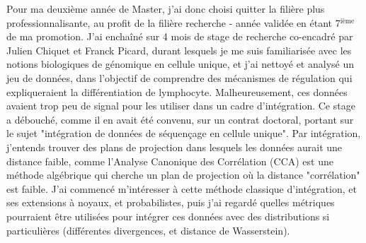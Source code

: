 \documentclass[a4paper,12pt]{article}
\begin{document}
Pour ma deuxième année de Master, j'ai donc choisi quitter la filière plus professionnalisante, au profit de la filière recherche - année validée en étant 7$^{\text{ième}}$ de ma promotion. 
J'ai enchaîné sur 4 mois de stage de recherche co-encadré par Julien Chiquet et Franck Picard, durant lesquels je me suis familiarisée avec les notions biologiques de génomique en cellule unique, et j'ai nettoyé et analysé un jeu de données, dans l'objectif de comprendre des mécanismes de régulation qui expliqueraient la différentiation de lymphocyte. Malheureusement, ces données avaient trop peu de signal pour les utiliser dans un cadre d'intégration. Ce stage a débouché, comme il en avait été convenu, sur un contrat doctoral, portant sur le sujet "intégration de données de séquençage en cellule unique". Par intégration, j'entends trouver des plans de projection dans lesquels les données aurait une distance faible, comme l'Analyse Canonique des Corrélation (CCA) est une méthode algébrique qui cherche un plan de projection où la distance "corrélation" est faible. J'ai commencé m'intéresser à cette méthode classique d'intégration, et ses extensions à noyaux, et probabilistes, puis j'ai regardé quelles métriques pourraient être utilisées pour intégrer ces données avec des distributions si particulières (différentes divergences, et distance de Wasserstein).%
\end{document}
